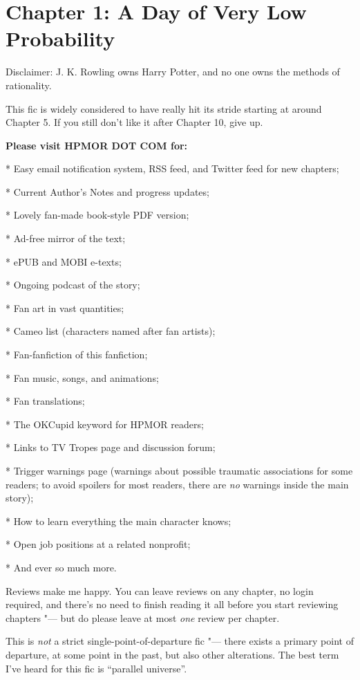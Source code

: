 \chapter{Chapter 1: A Day of Very Low Probability}
Disclaimer: J. K. Rowling owns Harry Potter, and no one owns the methods
of rationality.

This fic is widely considered to have really hit its stride starting at
around Chapter 5. If you still don't like it after Chapter 10, give up.

\textbf{Please visit HPMOR DOT COM for:}

* Easy email notification system, RSS feed, and Twitter feed for new
chapters;

* Current Author's Notes and progress updates;

* Lovely fan-made book-style PDF version;

* Ad-free mirror of the text;

* ePUB and MOBI e-texts;

* Ongoing podcast of the story;

* Fan art in vast quantities;

* Cameo list (characters named after fan artists);

* Fan-fanfiction of this fanfiction;

* Fan music, songs, and animations;

* Fan translations;

* The OKCupid keyword for HPMOR readers;

* Links to TV Tropes page and discussion forum;

* Trigger warnings page (warnings about possible traumatic associations
for some readers; to avoid spoilers for most readers, there are
\emph{no} warnings inside the main story);

* How to learn everything the main character knows;

* Open job positions at a related nonprofit;

* And ever so much more.

Reviews make me happy. You can leave reviews on any chapter, no login
required, and there's no need to finish reading it all before you start
reviewing chapters "--- but do please leave at most \emph{one} review per
chapter.

This is \emph{not} a strict single-point-of-departure fic "--- there exists
a primary point of departure, at some point in the past, but also other
alterations. The best term I've heard for this fic is ``parallel
universe''.

